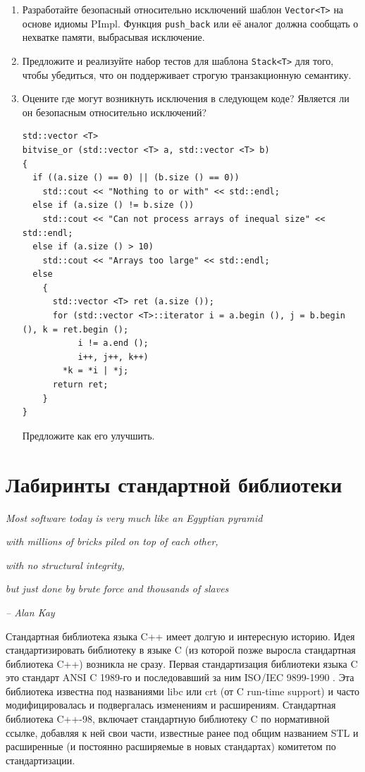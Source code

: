 \documentclass[a4paper,12pt,oneside]{article}
\begin{document}
\begin{enumerate}

\item Разработайте безопасный относительно исключений шаблон \lstinline!Vector<T>! на основе идиомы PImpl. Функция \lstinline!push_back! или её аналог должна сообщать о нехватке памяти, выбрасывая исключение.

\item Предложите и реализуйте набор тестов для шаблона \lstinline!Stack<T>! для того, чтобы убедиться, что он поддерживает строгую транзакционную семантику.

\item Оцените где могут возникнуть исключения в следующем коде? Является ли он безопасным относительно исключений?

\begin{lstlisting}
std::vector <T>
bitvise_or (std::vector <T> a, std::vector <T> b)
{
  if ((a.size () == 0) || (b.size () == 0))
    std::cout << "Nothing to or with" << std::endl;
  else if (a.size () != b.size ())
    std::cout << "Can not process arrays of inequal size" << std::endl;
  else if (a.size () > 10)
    std::cout << "Arrays too large" << std::endl;
  else
    {
      std::vector <T> ret (a.size ());
      for (std::vector <T>::iterator i = a.begin (), j = b.begin (), k = ret.begin (); 
           i != a.end (); 
           i++, j++, k++)
        *k = *i | *j;
      return ret;
    }
}
\end{lstlisting}

Предложите как его улучшить.

\end{enumerate}

\pagebreak
\section{Лабиринты стандартной библиотеки}

\hfill\textit{Most software today is very much like an Egyptian pyramid}

\hfill\textit{with millions of bricks piled on top of each other,}

\hfill\textit{with no structural integrity,}

\hfill\textit{but just done by brute force and thousands of slaves}{\vspace{0.5em}}

\hfill\textit{-- Alan Kay}

Стандартная библиотека языка C++ имеет долгую и интересную историю. Идея стандартизировать библиотеку в языке C (из которой позже выросла стандартная библиотека C++) возникла не сразу. Первая стандартизация библиотеки языка C это стандарт ANSI C 1989-го и последовавший за ним ISO/IEC 9899-1990 \cite{stdc90}. Эта библиотека известна под названиями libc или crt (от C run-time support) и часто модифицировалась и подвергалась изменениям и расширениям. Стандартная библиотека C++-98, включает стандартную библиотеку C по нормативной ссылке, добавляя к ней свои части, известные ранее под общим названием STL и расширенные (и постоянно расширяемые в новых стандартах) комитетом по стандартизации.
\end{document}

